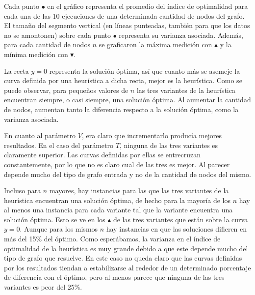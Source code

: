 \par{Cada punto $\bullet$ en el gráfico representa el promedio del índice de
optimalidad para cada una de las 10 ejecuciones de una determinada cantidad de
nodos del grafo. El tamaño del segmento vertical (en líneas punteadas, también
para que los datos no se amontonen) sobre cada punto $\bullet$
representa su varianza asociada. Además, para cada cantidad de nodos $n$ se
graficaron la máxima medición con $\blacktriangle$ y la mínima medición con
$\blacktriangledown$.}\\

\par{La recta $y=0$ representa la solución óptima, así que cuanto más se
asemeje la curva definida por una heurística a dicha recta, mejor es la
heurística. Como se puede observar, para pequeños valores de $n$ las tres
variantes de la heurística encuentran siempre, o casi siempre, una solución
óptima. Al aumentar la cantidad de nodos, aumentan tanto la diferencia
respecto a la solución óptima, como la varianza asociada.}\\

\par{En cuanto al parámetro $V$, era claro que incrementarlo producía
mejores resultados. En el caso del parámetro $T$, ninguna de las tres
variantes es claramente superior. Las curvas definidas por ellas se
entrecruzan constantemente, por lo que no es claro cual de las tres
es mejor. Al parecer depende mucho del tipo de grafo entrada y no de
la cantidad de nodos del mismo.}\\

\par{Incluso para $n$ mayores, hay instancias para las que las tres variantes de
la heurística encuentran una solución óptima, de hecho para la mayoría de los $n$
hay al menos una instancia para cada variante tal que la variante encuentra
una solución óptima. Esto se ve en los $\blacktriangle$ de las tres variantes
que están sobre la curva $y=0$. Aunque para los mismos $n$ hay instancias en
que las soluciones difieren en más del 15\% del óptimo. Como esperábamos, la
varianza en el índice de optimalidad de la heurística es muy grande debido a que
este depende mucho del tipo de grafo que resuelve. En este caso no queda claro
que las curvas definidas por los resultados tiendan a estabilizarse al rededor
de un determinado porcentaje de diferencia con el óptimo, pero al menos parece
que ninguna de las tres variantes es peor del 25\%.}
